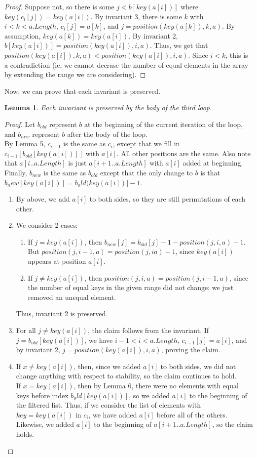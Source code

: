 \documentclass{article}
\newtheorem{lemma}[theorem]{Lemma}
\begin{document}
\begin{proof}
Suppose not, so there is some $j < b[key(a[i])]$ where $key(c_i[j]) = key(a[i])$. By invariant 3, there is some $k$ with $i < k < a.Length$, $c_i[j] = a[k]$, and $j = position(key(a[k]), k, a)$. By assumption, $key(a[k]) = key(a[i])$. By invariant 2, $b[key(a[i])] = position(key(a[i]), i, a)$. Thus, we get that $position(key(a[i]), k, a) < position(key(a[i]), i, a)$. Since $i< k$, this is a contradiction (ie, we cannot decrase the number of equal elements in the array by extending the range we are considering).
\end{proof}
Now, we can prove that each invariant is preserved.
\begin{lemma}
Each invariant is preserved by the body of the third loop.
\end{lemma}
\begin{proof}
Let $b_{old}$ represent $b$ at the beginning of the current iteration of the loop, and $b_{new}$ represent $b$ after the body of the loop.
\\By Lemma 5, $c_{i-1}$ is the same as $c_i$, except that we fill in $c_{i-1}[b_{old}[key(a[i])]]$ with $a[i]$. All other positions are the same. Also note that $a[i..a.Length]$ is just $a[i+1..a.Length]$ with $a[i]$ added at beginning. Finally, $b_{new}$ is the same as $b_{old}$ except that  the only change to $b$ is that $b_new[key(a[i])] = b_old(key(a[i])] - 1$.
\begin{enumerate}
\item
By above, we add $a[i]$ to both sides, so they are still permutations of each other.
\item
We consider 2 cases:
\begin{enumerate}
\item
If $j=key(a[i])$, then $b_{new}[j] = b_{old}[j] -1 - position(j, i, a) - 1$. But $position(j, i-1, a) = position(j, i a) - 1$, since $key(a[i])$ appears at position $a[i]$.
\item
If $j \neq key(a[i])$, then $position(j, i, a) = position(j, i-1, a)$, since the number of equal keys in the given range did not change; we just removed an unequal element.
\end{enumerate}
Thus, invariant 2 is preserved.
\item
For all $j\neq key(a[i])$, the claim follows from the invariant. If $j=b_{old}[key(a[i])]$, we have $i-1 < i < a.Length$, $c_{i-1}[j] = a[i]$, and by invariant 2, $j = position(key(a[i]), i, a)$, proving the claim.
\item
If $x\neq key(a[i])$, then, since we added $a[i]$ to both sides, we did not change anything with respect to stability, so the claim continues to hold.
\\If $x = key(a[i])$, then by Lemma 6, there were no elements with equal keys before index $b_old[key(a[i])]$, so we added $a[i]$ to the beginning of the filtered list. Thus, if we consider the list of elements with $key=key(a[i])$ in $c_i$, we have added $a[i]$ before all of the others. Likewise, we added $a[i]$ to the beginning of $a[i+1..a.Length]$, so the claim holds.
\end{enumerate}
\end{proof}
\end{document}
